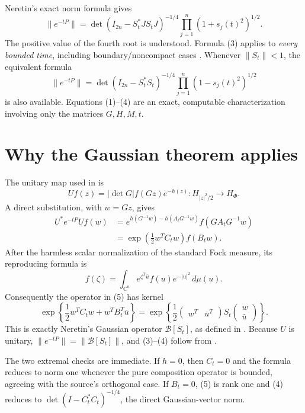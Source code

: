 \documentclass[11pt]{article}
\newcommand{\C}{\mathbb C}
\begin{document}
Neretin's exact norm formula gives
\[
 \boxed{
 \|e^{-tP}\|
 =\det(I_{2n}-S_t^*J S_tJ)^{-1/4}
   \prod_{j=1}^n(1+s_j(t)^2)^{1/2}.}                   \tag{3}
\]
The positive value of the fourth root is understood.  Formula (3) applies to
\emph{every bounded time}, including boundary/noncompact cases
\cite[Chapter 6, Theorem 2.2(b)]{Neretin}.  Whenever \(\|S_t\|<1\), the
equivalent formula
\[
 \boxed{
 \|e^{-tP}\|
 =\det(I_{2n}-S_t^*S_t)^{-1/4}
   \prod_{j=1}^n(1-s_j(t)^2)^{1/2}}                    \tag{4}
\]
is also available.  Equations (1)--(4) are an exact, computable
characterization involving only the matrices \(G,H,M,t\).

\section*{Why the Gaussian theorem applies}

The unitary map used in \cite[Lemma 2.3]{AV} is
\[
 Uf(z)=|\det G|f(Gz)e^{-h(z)}:H_{|z|^2/2}\longrightarrow H_\Phi.
\]
A direct substitution, with \(w=Gz\), gives
\begin{align*}
 U^*e^{-tP}Uf(w)
 &=e^{h(G^{-1}w)-h(A_tG^{-1}w)}f(GA_tG^{-1}w)\\
 &=\exp\!\left(\frac12w^TC_tw\right)f(B_tw).           \tag{5}
\end{align*}
After the harmless scalar normalization of the standard Fock measure, its
reproducing formula is
\[
 f(\zeta)=\int_{\C^n}e^{\zeta^T\bar u}f(u)e^{-|u|^2}\,d\mu(u).
\]
Consequently the operator in (5) has kernel
\[
 \exp\!\left\{\frac12w^TC_tw+w^TB_t^T\bar u\right\}
 =\exp\!\left\{\frac12
 \begin{pmatrix}w^T&\bar u^T\end{pmatrix}
 S_t\begin{pmatrix}w\\\bar u\end{pmatrix}\right\}. \tag{6}
\]
This is exactly Neretin's Gaussian operator \(\mathcal B[S_t]\), as defined
in \cite[Chapter 5, equation (1.4)]{Neretin}.  Because \(U\) is unitary,
\(\|e^{-tP}\|=\|\mathcal B[S_t]\|\), and (3)--(4) follow from
\cite[Chapter 6, Theorems 1.4 and 2.2]{Neretin}.

The two extremal checks are immediate.  If \(h=0\), then \(C_t=0\) and the
formula reduces to norm one whenever the pure composition operator is
bounded, agreeing with the source's orthogonal case.  If \(B_t=0\), (5) is
rank one and (4) reduces to
\(\det(I-C_t^*C_t)^{-1/4}\), the direct Gaussian-vector norm.
\end{document}
